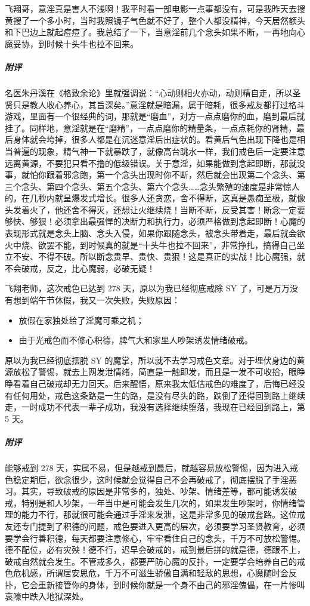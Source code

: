 \begin{case}
    飞翔哥，意淫真是害人不浅啊！我平时看一部电影一点事都没有，可是我昨天去搜黄搜了一个多小时，当时我照镜子气色就不好了，整个人都没精神，今天居然额头和下巴边上就起痘痘了。我总结了一下，当意淫前几个念头如果不断，一再地向心魔妥协，到时候十头牛也拉不回来。
    \subparagraph{附评} 名医朱丹溪在《格致余论》里就强调说：“心动则相火亦动，动则精自走，所以圣贤只是教人收心养心，其旨深矣。”意淫就是暗漏，属于暗耗，很多戒友都打过格斗游戏，里面有一个很经典的词，那就是“磨血”，对方一点点磨你的血，磨到最后就挂了。同样地，意淫就是在“磨精”，一点点磨你的精量条，一点点耗你的肾精，最后身体就会垮掉，很多人都是在沉迷意淫后出症状的。看黄后气色出现下降也是相当普遍的现象，精气神一下就暴跌了，就像高台跳水一样，我们戒色后一定要注意远离黄源，不要犯只看不撸的低级错误。关于意淫，如果能做到念起即断，那就没事，就怕你跟着邪念跑，第一个念头出现时你不断，然后就会出现第二个念头、第三个念头、第四个念头、第五个念头、第六个念头……念头繁殖的速度是非常惊人的，在几秒内就呈爆发式增长。很多人还贪恋，舍不得断，这真是愚痴至极，就像头发着火了，他还舍不得灭，还想让火继续烧！当断不断，反受其害！断念一定要够快、够狠！必须拿出最强悍的决断力和执行力，必须严格做到念起即断！心魔的表现形式就是念头上脑、念头入侵，如果你跟随念头，被念头带着走，最后就会欲火中烧、欲罢不能，到时候真的就是“十头牛也拉不回来”，非常挣扎，搞得自己坐立不安、不得不破。所以断念贵早、贵快、贵狠！这是真正的实战！比心魔强，就不会破戒，反之，比心魔弱，必破无疑！
\end{case}

\begin{case}
    飞翔老师，这次戒色已达到 278 天，原以为我已经彻底戒除 SY 了，可是万万没有想到端午节休假，我又一次失败，失败原因：\begin{itemize}
        \item 放假在家独处给了淫魔可乘之机；
        \item 由于光戒色而不修心积德，脾气大和家里人吵架诱发情绪破戒。
    \end{itemize} 原以为我已经彻底摆脱 SY 的魔掌，所以就不去学习戒色文章。对于埋伏身边的黄源放松了警惕，就去上网发泄情绪，简直是一触即发，而且是一发不可收拾，眼睁睁看着自己破戒却无力回天。后来醒悟，原来我太低估戒色的难度了，后悔已经没有任何用处，戒色这条路是一生的路，是没有尽头的路，跌倒了还得回到路上继续走，一时成功不代表一辈子成功，我没有选择继续堕落，我现在已经回到路上，第 5 天。
    \subparagraph{附评} 能够戒到 278 天，实属不易，但是越戒到最后，就越容易放松警惕，因为进入戒色稳定期后，欲念很少，这时候就会觉得自己不会再破戒了，彻底摆脱了手淫恶习。其实，导致破戒的原因是非常多的，独处、吵架、情绪差等，都可能诱发破戒，特别是和人吵架，一年当中是可能会发生几次的，如果发生吵架时，你情绪管理的能力不行，那就很可能会通过手淫来发泄，这是非常多见的破戒套路。这位戒友还专门提到了积德的问题，戒色要进入更高的层次，必须要学习圣贤教育，必须要学会行善积德，每天都要注意修心，牢牢看住自己的念头，千万不可放松警惕。德不配位，必有灾殃！德不行，迟早会破戒的，戒到最后拼的就是德，德跟不上，破戒自然就会发生。不管戒多久，都要严防心魔的反扑，一定要学会培养自己的戒色危机感，所谓居安思危，千万不可滋生骄傲自满和轻敌的思想，心魔随时会反扑，它会重新接管你的身体，到时候你就是一个身不由己的邪淫傀儡，在一片惨叫哀嚎中跌入地狱深处。
\end{case}

